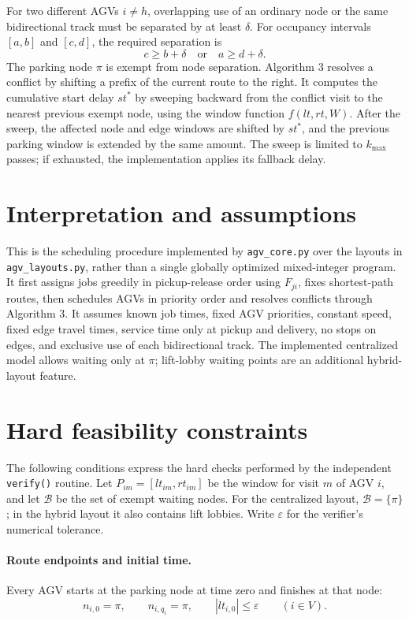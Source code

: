 \documentclass[11pt]{article}
\begin{document}
For two different AGVs $i\ne h$, overlapping use of an ordinary node or the
same bidirectional track must be separated by at least $\delta$. For occupancy
intervals $[a,b]$ and $[c,d]$, the required separation is
\[
  c\ge b+\delta
  \quad\text{or}\quad
  a\ge d+\delta.
\]
The parking node $\pi$ is exempt from node separation. Algorithm 3 resolves a
conflict by shifting a prefix of the current route to the right. It computes
the cumulative start delay $st^*$ by sweeping backward from the conflict visit
to the nearest previous exempt node, using the window function
$f(lt,rt,W)$. After the sweep, the affected node and edge windows are shifted
by $st^*$, and the previous parking window is extended by the same amount. The
sweep is limited to $k_{\max}$ passes; if exhausted, the implementation applies
its fallback delay.

\section{Interpretation and assumptions}

This is the scheduling procedure implemented by \texttt{agv\_core.py} over the
layouts in \texttt{agv\_layouts.py}, rather than a single globally optimized
mixed-integer program. It first assigns jobs greedily in pickup-release order
using $F_{ji}$, fixes shortest-path routes, then schedules AGVs in priority
order and resolves conflicts through Algorithm 3. It assumes known job times,
fixed AGV priorities, constant speed, fixed edge travel times, service time
only at pickup and delivery, no stops on edges, and exclusive use of each
bidirectional track. The implemented centralized model allows waiting only at
$\pi$; lift-lobby waiting points are an additional hybrid-layout feature.

\section{Hard feasibility constraints}

The following conditions express the hard checks performed by the independent
\texttt{verify()} routine. Let $P_{im}=[lt_{im},rt_{im}]$ be the window for
visit $m$ of AGV $i$, and let $\mathcal{B}$ be the set of exempt waiting nodes.
For the centralized layout, $\mathcal{B}=\{\pi\}$; in the hybrid layout it
also contains lift lobbies. Write $\varepsilon$ for the verifier's numerical
tolerance.

\paragraph{Route endpoints and initial time.}
Every AGV starts at the parking node at time zero and finishes at that node:
\[
  n_{i,0}=\pi,\qquad n_{i,q_i}=\pi,\qquad |lt_{i,0}|\le\varepsilon
  \qquad (i\in V).
\]
\end{document}
